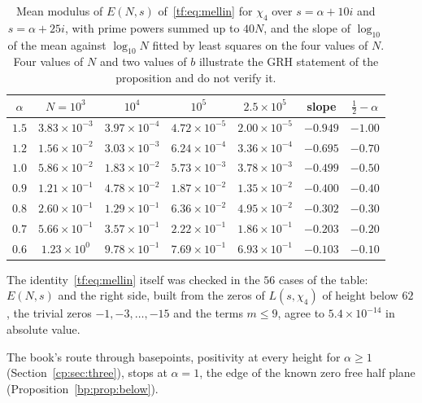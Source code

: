 \begin{table}[htbp]
\centering\footnotesize\setlength{\tabcolsep}{3pt}
\begin{tabular}{@{}ccccccc@{}}
\toprule
$\alpha$ & $N=10^3$ & $10^4$ & $10^5$ & $2.5\times10^5$ & slope & $\tfrac12-\alpha$\\
\midrule
$1.5$ & $3.83\times10^{-3}$ & $3.97\times10^{-4}$ & $4.72\times10^{-5}$ & $2.00\times10^{-5}$ & $-0.949$ & $-1.00$\\
$1.2$ & $1.56\times10^{-2}$ & $3.03\times10^{-3}$ & $6.24\times10^{-4}$ & $3.36\times10^{-4}$ & $-0.695$ & $-0.70$\\
$1.0$ & $5.86\times10^{-2}$ & $1.83\times10^{-2}$ & $5.73\times10^{-3}$ & $3.78\times10^{-3}$ & $-0.499$ & $-0.50$\\
$0.9$ & $1.21\times10^{-1}$ & $4.78\times10^{-2}$ & $1.87\times10^{-2}$ & $1.35\times10^{-2}$ & $-0.400$ & $-0.40$\\
$0.8$ & $2.60\times10^{-1}$ & $1.29\times10^{-1}$ & $6.36\times10^{-2}$ & $4.95\times10^{-2}$ & $-0.302$ & $-0.30$\\
$0.7$ & $5.66\times10^{-1}$ & $3.57\times10^{-1}$ & $2.22\times10^{-1}$ & $1.86\times10^{-1}$ & $-0.203$ & $-0.20$\\
$0.6$ & $1.23\times10^{0}$ & $9.78\times10^{-1}$ & $7.69\times10^{-1}$ & $6.93\times10^{-1}$ & $-0.103$ & $-0.10$\\
\bottomrule
\end{tabular}
\caption{Mean modulus of $E(N,s)$ of~\eqref{tf:eq:mellin} for $\chi_4$ over $s=\alpha+10i$ and $s=\alpha+25i$, with prime powers summed up to $40N$, and the slope of $\log_{10}$ of the mean against $\log_{10}N$ fitted by least squares on the four values of $N$. Four values of $N$ and two values of $b$ illustrate the GRH statement of the proposition and do not verify it.}
\label{tf:tab:mellin}
\end{table}

The identity~\eqref{tf:eq:mellin} itself was checked in the $56$ cases of the table: $E(N,s)$ and the right side, built from the zeros of $L(s,\chi_4)$ of height below $62$, the trivial zeros $-1,-3,\dots,-15$ and the terms $m\le9$, agree to $5.4\times10^{-14}$ in absolute value.

The book's route through basepoints, positivity at every height for $\alpha\ge1$ (Section~\ref{cp:sec:three}), stops at $\alpha=1$, the edge of the known zero free half plane (Proposition~\ref{bp:prop:below}).
